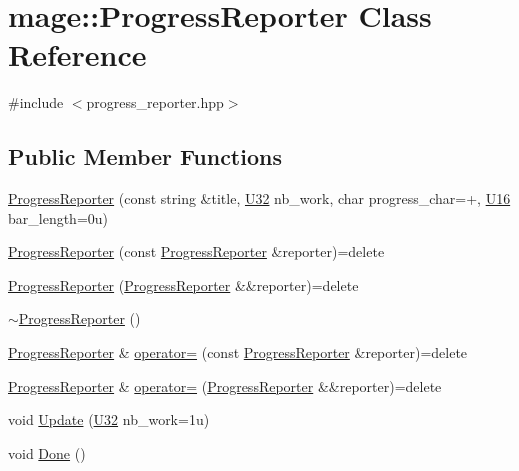 \hypertarget{classmage_1_1_progress_reporter}{}\section{mage\+:\+:Progress\+Reporter Class Reference}
\label{classmage_1_1_progress_reporter}


{\ttfamily \#include $<$progress\+\_\+reporter.\+hpp$>$}

\subsection*{Public Member Functions}
\begin{DoxyCompactItemize}
\item 
\hyperlink{classmage_1_1_progress_reporter_a900eb503981e2d83b721ce0612950285}{Progress\+Reporter} (const string \&title, \hyperlink{namespacemage_a41c104c036fba3756a74e19f793eeaa1}{U32} nb\+\_\+work, char progress\+\_\+char=\textquotesingle{}+\textquotesingle{}, \hyperlink{namespacemage_af69057eec1ce005c1c3b34ae33486f16}{U16} bar\+\_\+length=0u)
\item 
\hyperlink{classmage_1_1_progress_reporter_a681d23ec19019c04a8a977c4f6f280ea}{Progress\+Reporter} (const \hyperlink{classmage_1_1_progress_reporter}{Progress\+Reporter} \&reporter)=delete
\item 
\hyperlink{classmage_1_1_progress_reporter_a03a08df55eb7f7f744efc4543c042fcc}{Progress\+Reporter} (\hyperlink{classmage_1_1_progress_reporter}{Progress\+Reporter} \&\&reporter)=delete
\item 
\hyperlink{classmage_1_1_progress_reporter_aa543239c6dd4474a77cf4cf6904c1b26}{$\sim$\+Progress\+Reporter} ()
\item 
\hyperlink{classmage_1_1_progress_reporter}{Progress\+Reporter} \& \hyperlink{classmage_1_1_progress_reporter_aa98411a059ad0e77ca53d064176f3a86}{operator=} (const \hyperlink{classmage_1_1_progress_reporter}{Progress\+Reporter} \&reporter)=delete
\item 
\hyperlink{classmage_1_1_progress_reporter}{Progress\+Reporter} \& \hyperlink{classmage_1_1_progress_reporter_adfc77427eaff8caf71c1995bf986edc5}{operator=} (\hyperlink{classmage_1_1_progress_reporter}{Progress\+Reporter} \&\&reporter)=delete
\item 
void \hyperlink{classmage_1_1_progress_reporter_aee55b3ced46f7512634b0443ff9807f5}{Update} (\hyperlink{namespacemage_a41c104c036fba3756a74e19f793eeaa1}{U32} nb\+\_\+work=1u)
\item 
void \hyperlink{classmage_1_1_progress_reporter_a11d758647ac2082bc296ab53a7454eaa}{Done} ()
\end{DoxyCompactItemize}
